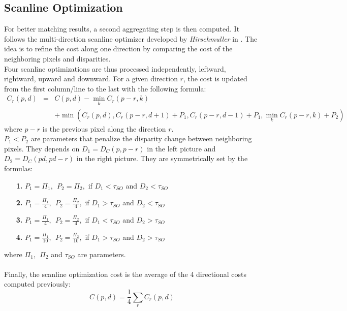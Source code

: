 \documentclass{ipol}
\begin{document}
\subsection{Scanline Optimization}

For better matching results, a second aggregating step is then computed. It follows the multi-direction scanline optimizer developed by \textit{Hirschmuller} in \cite{scanlineOptim}. The idea is to refine the cost along one direction by comparing the cost of the neighboring pixels and disparities.\\
Four scanline optimizations are thus processed independently, leftward, rightward, upward and downward. For a given direction $r$, the cost is updated from the first column/line to the last with the following formula:
\begin{eqnarray*}
	C_r (p, d) &=&
	 C(p, d) - \min_k C_r(p-r, k)\\
	 && + \min\left( C_r(p, d) , C_r(p-r, d+1) + P_1, C_r(p-r, d-1) + P_1, \min_k C_r(p-r, k) + P_2\right)
\end{eqnarray*}
where $p-r$ is the previous pixel along the direction $r$.\\
$P_1 < P_2$ are parameters that penalize the disparity change between neighboring pixels. They depends on $D_1 = D_C(p, p-r)$ in the left picture and $D_2 = D_C(pd, pd-r)$ in the right picture. They are symmetrically set by the formulas:
\begin{itemize}
	\item[\textbf{1. }]$P_1 = \Pi_1, \ \ P_2 = \Pi_2,$ if $D_1 < \tau_{SO}$ and $D_2 < \tau_{SO}$
	\item[\textbf{2. }]$P_1 = \frac{\Pi_1}{4}, \ \ P_2 =\frac{\Pi_2}{4},$ if $D_1 > \tau_{SO}$ and $D_2 < \tau_{SO}$
	\item[\textbf{3. }]$P_1 = \frac{\Pi_1}{4}, \ \ P_2 =\frac{\Pi_2}{4},$ if $D_1 < \tau_{SO}$ and $D_2 > \tau_{SO}$
	\item[\textbf{4. }]$P_1 = \frac{\Pi_1}{10}, \ \ P_2 =\frac{\Pi_2}{10},$ if $D_1 > \tau_{SO}$ and $D_2 > \tau_{SO}$
\end{itemize}
where $\Pi_1, \ \ \Pi_2 $ and $\tau_{SO}$ are parameters.\\
\\
Finally, the scanline optimization cost is the average of the 4 directional costs computed previously:
\[
	C(p, d) = \frac{1}{4} \sum_r C_r(p,d)
\]
\end{document}
